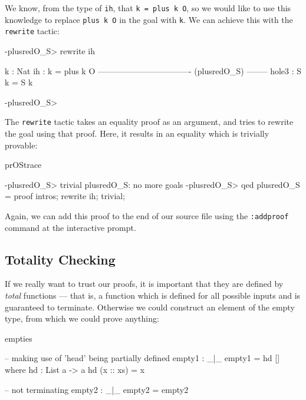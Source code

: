 \noindent
We know, from the type of \texttt{ih}, that \texttt{k = plus k O}, so we would like to
use this knowledge to replace \texttt{plus k O} in the goal with \texttt{k}. We can
achieve this with the \texttt{rewrite} tactic:

\begin{SaveVerbatim}{}

-plusredO_S> rewrite ih 

  k : Nat
  ih : k = plus k O
---------------------------------- (plusredO_S) --------
{hole3} : S k = S k

-plusredO_S>  

\end{SaveVerbatim}
\useverb{}

\noindent
The \texttt{rewrite} tactic takes an equality proof as an argument, and tries to rewrite
the goal using that proof. Here, it results in an equality which is trivially provable:

\begin{SaveVerbatim}{prOStrace}

-plusredO_S> trivial 
plusredO_S: no more goals
-plusredO_S> qed 
plusredO_S = proof {
    intros;
    rewrite ih;
    trivial;
}

\end{SaveVerbatim}

\noindent
Again, we can add this proof to the end of our source file using the \texttt{:addproof}
command at the interactive prompt.

\subsection{Totality Checking}

\label{sect:totality}

If we really want to trust our proofs, it is important that they are defined by
\emph{total} functions --- that is, a function which is defined for all possible inputs
and is guaranteed to terminate. Otherwise we could construct an element of the empty type,
from which we could prove anything:

\begin{SaveVerbatim}{empties}

-- making use of 'head' being partially defined
empty1 : _|_
empty1 = hd [] where
    hd : List a -> a
    hd (x :: xs) = x

-- not terminating
empty2 : _|_
empty2 = empty2

\end{SaveVerbatim}

